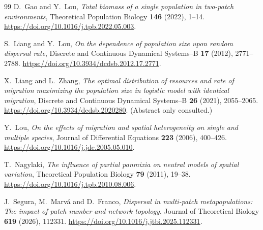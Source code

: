 \documentclass[11pt]{article}
\theoremstyle{remark}
\begin{document}
\begin{thebibliography}{99}
D.~Gao and Y.~Lou,
\emph{Total biomass of a single population in two-patch environments},
Theoretical Population Biology \textbf{146} (2022), 1--14.
\url{https://doi.org/10.1016/j.tpb.2022.05.003}.

S.~Liang and Y.~Lou,
\emph{On the dependence of population size upon random dispersal rate},
Discrete and Continuous Dynamical Systems--B \textbf{17} (2012),
2771--2788.
\url{https://doi.org/10.3934/dcdsb.2012.17.2771}.

X.~Liang and L.~Zhang,
\emph{The optimal distribution of resources and rate of migration
maximizing the population size in logistic model with identical
migration},
Discrete and Continuous Dynamical Systems--B \textbf{26} (2021),
2055--2065.
\url{https://doi.org/10.3934/dcdsb.2020280}.
(Abstract only consulted.)

Y.~Lou,
\emph{On the effects of migration and spatial heterogeneity on single and
multiple species},
Journal of Differential Equations \textbf{223} (2006), 400--426.
\url{https://doi.org/10.1016/j.jde.2005.05.010}.

T.~Nagylaki,
\emph{The influence of partial panmixia on neutral models of spatial
variation},
Theoretical Population Biology \textbf{79} (2011), 19--38.
\url{https://doi.org/10.1016/j.tpb.2010.08.006}.

J.~Segura, M.~Marv\'a and D.~Franco,
\emph{Dispersal in multi-patch metapopulations: The impact of patch
number and network topology},
Journal of Theoretical Biology \textbf{619} (2026), 112331.
\url{https://doi.org/10.1016/j.jtbi.2025.112331}.

\end{thebibliography}
\end{document}
